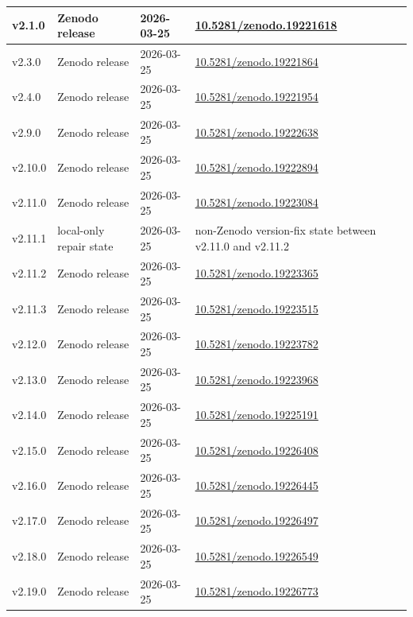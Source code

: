 {\begin{longtable}{|p{}|p{}|p{}|p{}|}
\hline
v2.1.0 & Zenodo release & 2026-03-25 & \href{https://doi.org/10.5281/zenodo.19221618}{10.5281/zenodo.19221618} \\
\hline
v2.3.0 & Zenodo release & 2026-03-25 & \href{https://doi.org/10.5281/zenodo.19221864}{10.5281/zenodo.19221864} \\
\hline
v2.4.0 & Zenodo release & 2026-03-25 & \href{https://doi.org/10.5281/zenodo.19221954}{10.5281/zenodo.19221954} \\
\hline
v2.9.0 & Zenodo release & 2026-03-25 & \href{https://doi.org/10.5281/zenodo.19222638}{10.5281/zenodo.19222638} \\
\hline
v2.10.0 & Zenodo release & 2026-03-25 & \href{https://doi.org/10.5281/zenodo.19222894}{10.5281/zenodo.19222894} \\
\hline
v2.11.0 & Zenodo release & 2026-03-25 & \href{https://doi.org/10.5281/zenodo.19223084}{10.5281/zenodo.19223084} \\
\hline
v2.11.1 & local-only repair state & 2026-03-25 & non-Zenodo version-fix state between v2.11.0 and v2.11.2 \\
\hline
v2.11.2 & Zenodo release & 2026-03-25 & \href{https://doi.org/10.5281/zenodo.19223365}{10.5281/zenodo.19223365} \\
\hline
v2.11.3 & Zenodo release & 2026-03-25 & \href{https://doi.org/10.5281/zenodo.19223515}{10.5281/zenodo.19223515} \\
\hline
v2.12.0 & Zenodo release & 2026-03-25 & \href{https://doi.org/10.5281/zenodo.19223782}{10.5281/zenodo.19223782} \\
\hline
v2.13.0 & Zenodo release & 2026-03-25 & \href{https://doi.org/10.5281/zenodo.19223968}{10.5281/zenodo.19223968} \\
\hline
v2.14.0 & Zenodo release & 2026-03-25 & \href{https://doi.org/10.5281/zenodo.19225191}{10.5281/zenodo.19225191} \\
v2.15.0 & Zenodo release & 2026-03-25 & \href{https://doi.org/10.5281/zenodo.19226408}{10.5281/zenodo.19226408} \\
\hline
v2.16.0 & Zenodo release & 2026-03-25 & \href{https://doi.org/10.5281/zenodo.19226445}{10.5281/zenodo.19226445} \\
\hline
v2.17.0 & Zenodo release & 2026-03-25 & \href{https://doi.org/10.5281/zenodo.19226497}{10.5281/zenodo.19226497} \\
v2.18.0 & Zenodo release & 2026-03-25 & \href{https://doi.org/10.5281/zenodo.19226549}{10.5281/zenodo.19226549} \\
\hline
v2.19.0 & Zenodo release & 2026-03-25 & \href{https://doi.org/10.5281/zenodo.19226773}{10.5281/zenodo.19226773} \\

\end{longtable}}
